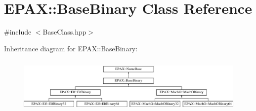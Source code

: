 \hypertarget{class_e_p_a_x_1_1_base_binary}{\section{\-E\-P\-A\-X\-:\-:\-Base\-Binary \-Class \-Reference}
\label{class_e_p_a_x_1_1_base_binary}
}


{\ttfamily \#include $<$\-Base\-Class.\-hpp$>$}

\-Inheritance diagram for \-E\-P\-A\-X\-:\-:\-Base\-Binary\-:\begin{figure}[H]
\begin{center}
\leavevmode
\includegraphics[height=2.786070cm]{class_e_p_a_x_1_1_base_binary}
\end{center}
\end{figure}

